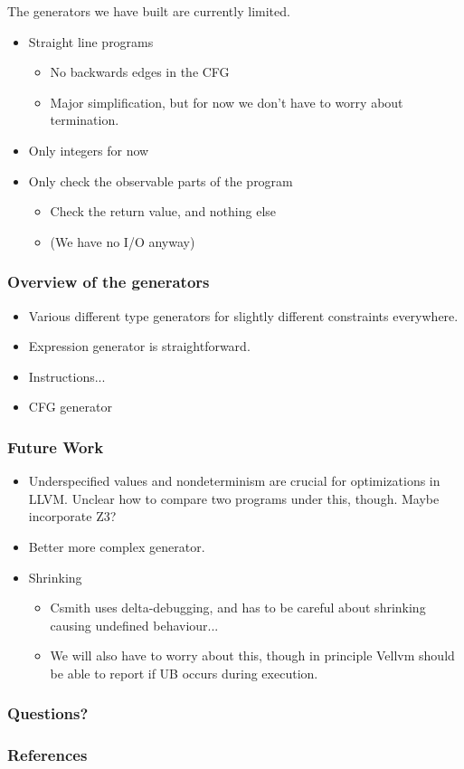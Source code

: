 \documentclass{beamer}
\begin{document}
\begin{frame}
  The generators we have built are currently limited.

  \begin{itemize}
  \item Straight line programs
    \begin{itemize}
    \item No backwards edges in the CFG
    \item Major simplification, but for now we don't have to worry
      about termination.
    \end{itemize}
  \item Only integers for now
  \item Only check the observable parts of the program
    \begin{itemize}
    \item Check the return value, and nothing else
    \item (We have no I/O anyway)
    \end{itemize}
  \end{itemize}
\end{frame}

\begin{frame}
  \frametitle{Overview of the generators}

  \begin{itemize}
  \item Various different type generators for slightly different
    constraints everywhere.
  \item Expression generator is straightforward.
  \item Instructions...
  \item CFG generator
  \end{itemize}

\end{frame}

\begin{frame}
  \frametitle{Future Work}

  \begin{itemize}
  \item Underspecified values and nondeterminism are crucial for
    optimizations in LLVM. Unclear how to compare two programs under
    this, though. Maybe incorporate Z3?
  \item Better more complex generator.
  \item Shrinking
    \begin{itemize}
    \item Csmith uses delta-debugging, and has to be careful about
      shrinking causing undefined behaviour...
    \item We will also have to worry about this, though in principle
      Vellvm should be able to report if UB occurs during execution.
    \end{itemize}
  \end{itemize}
\end{frame}

\begin{frame}
  \frametitle{Questions?}

\end{frame}

\begin{frame}
  \frametitle{References}

  \nocite{*}
  \printbibliography
\end{frame}
\end{document}
